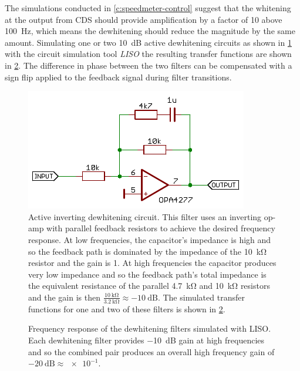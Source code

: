 The simulations conducted in \cref{c:speedmeter-control} suggest that the whitening at the output from \gls{CDS} should provide amplification by a factor of \num{10} above \SI{100}{\hertz}, which means the dewhitening should reduce the magnitude by the same amount. Simulating one or two \SI{10}{\deci\bel} active dewhitening circuits as shown in \cref{fig:hv-amp-dewhitening-circuit} with the circuit simulation tool \emph{\gls{LISO}} the resulting transfer functions are shown in \cref{fig:hv-amp-dewhitening-sims}. The difference in phase between the two filters can be compensated with a sign flip applied to the feedback signal during filter transitions.

\begin{figure}[htp]
  \centering
  \includegraphics[width=0.6\columnwidth]{graphics/60-hv-amp-dewhitening.pdf}
  \caption[Active inverting dewhitening circuit]{Active inverting dewhitening circuit. This filter uses an inverting op-amp with parallel feedback resistors to achieve the desired frequency response. At low frequencies, the capacitor's impedance is high and so the feedback path is dominated by the impedance of the \SI{10}{\kilo\ohm} resistor and the gain is \num{1}. At high frequencies the capacitor produces very low impedance and so the feedback path's total impedance is the equivalent resistance of the parallel \SI{4.7}{\kilo\ohm} and \SI{10}{\kilo\ohm} resistors and the gain is then $\frac{\SI{10}{\kilo\ohm}}{\SI{3.2}{\kilo\ohm}} \approx \SI{-10}{\deci\bel}$. The simulated transfer functions for one and two of these filters is shown in \cref{fig:hv-amp-dewhitening-sims}.}
  \label{fig:hv-amp-dewhitening-circuit}
\end{figure}

\begin{figure}[htp]
  \centering
  
  \caption[Simulated dewhitening filter frequency response]{Frequency response of the dewhitening filters simulated with \gls{LISO}. Each dewhitening filter provides \SI{-10}{\deci\bel} gain at high frequencies and so the combined pair produces an overall high frequency gain of $\SI{-20}{\deci\bel} \approx \num{e-1}$.}
  \label{fig:hv-amp-dewhitening-sims}
\end{figure}

